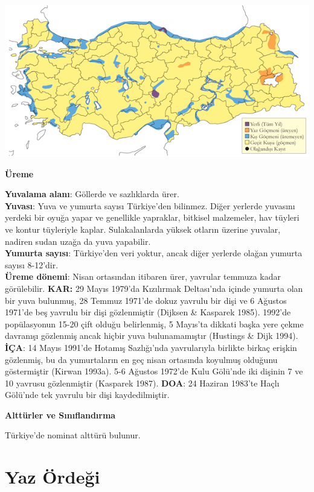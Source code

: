 \documentclass[
  letterpaper,
  DIV=11,
  numbers=noendperiod]{scrreprt}
\begin{document}
\includegraphics{images/harita_Page_020.png}

\textbf{Üreme}

\textbf{Yuvalama alanı}: Göllerde ve sazlıklarda ürer.\\
\textbf{Yuvası}: Yuva ve yumurta sayısı Türkiye'den bilinmez. Diğer
yerlerde yuvasını yerdeki bir oyuğa yapar ve genellikle yapraklar,
bitkisel malzemeler, hav tüyleri ve kontur tüyleriyle kaplar.
Sulakalanlarda yüksek otların üzerine yuvalar, nadiren sudan uzağa da
yuva yapabilir.\\
\textbf{Yumurta sayısı}: Türkiye'den veri yoktur, ancak diğer yerlerde
olağan yumurta sayısı 8-12'dir.\\
\textbf{Üreme dönemi}: Nisan ortasından itibaren ürer, yavrular temmuza
kadar görülebilir. \textbf{KAR:} 29 Mayıs 1979'da Kızılırmak Deltası'nda
içinde yumurta olan bir yuva bulunmuş, 28 Temmuz 1971'de dokuz yavrulu
bir dişi ve 6 Ağustos 1971'de beş yavrulu bir dişi gözlenmiştir (Dijksen
\& Kasparek 1985). 1992'de popülasyonun 15-20 çift olduğu belirlenmiş, 5
Mayıs'ta dikkati başka yere çekme davranışı gözlenmiş ancak hiçbir yuva
bulunamamıştır (Hustings \& Dijk 1994). \textbf{İÇA}: 14 Mayıs 1991'de
Hotamış Sazlığı'nda yavrularıyla birlikte birkaç erişkin gözlenmiş, bu
da yumurtaların en geç nisan ortasında koyulmuş olduğunu göstermiştir
(Kirwan 1993a). 5-6 Ağustos 1972'de Kulu Gölü'nde iki dişinin 7 ve 10
yavrusu gözlenmiştir (Kasparek 1987). \textbf{DOA}: 24 Haziran 1983'te
Haçlı Gölü'nde tek yavrulu bir dişi kaydedilmiştir.

\textbf{Alttürler ve Sınıflandırma}

Türkiye'de nominat alttürü bulunur.

\section{Yaz Ördeği}\label{yaz-uxf6rdeux11fi}
\end{document}
